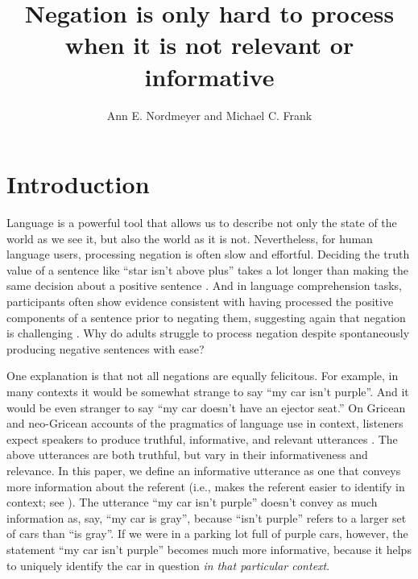 \documentclass[man, noapacite]{apa2}
\title{Negation is only hard to process when it is not relevant or informative}
\author{Ann E. Nordmeyer and Michael C. Frank}
\affiliation{Department of Psychology, Stanford University \\ 
Corresponding author: Ann E. Nordmeyer \\
Department of Psychology \\
Stanford University \\
Building 420 (Jordan Hall) \\
450 Serra Mall \\
Stanford, CA 94305 \\
Phone: 650-721-9270 \\
Email: anordmey@stanford.edu }
\begin{document}
\maketitle

\section{Introduction}

Language is a powerful tool that allows us to describe not only the state of the world as we see it, but also the world as it is not. Nevertheless, for human language users, processing negation is often slow and effortful. Deciding the truth value of a sentence like ``star isn't above plus''  takes a lot longer than making the same decision about a positive sentence \cite{hclark1972, carpenter1975, just1971, just1976}. And in language comprehension tasks, participants often show evidence consistent with having processed the positive components of a sentence prior to negating them, suggesting again that negation is challenging \cite{kaup2003, kaup2006, hasson2006, fischler1983, ludtke2008}. Why do adults struggle to process negation despite spontaneously producing negative sentences with ease?

One explanation is that not all negations are equally felicitous. For example, in many contexts it would be somewhat strange to say ``my car isn't purple''.  And it would be even stranger to say ``my car doesn't have an ejector seat.''  On Gricean and neo-Gricean accounts of the pragmatics of language use in context, listeners expect speakers to produce truthful, informative, and relevant utterances \cite{grice1975, horn1984, levinson2000, sperber1986}. The above utterances are both truthful, but vary in their informativeness and relevance. In this paper, we define an informative utterance as one that conveys more information about the referent (i.e., makes the referent easier to identify in context; see ). The utterance ``my car isn't purple'' doesn't convey as much information as, say, ``my car is gray'', because ``isn't purple'' refers to a larger set of cars than ``is gray''. If we were in a parking lot full of purple cars, however, the statement ``my car isn't purple'' becomes much more informative, because it helps to uniquely identify the car in question \emph{in that particular context}. 
\end{document}
